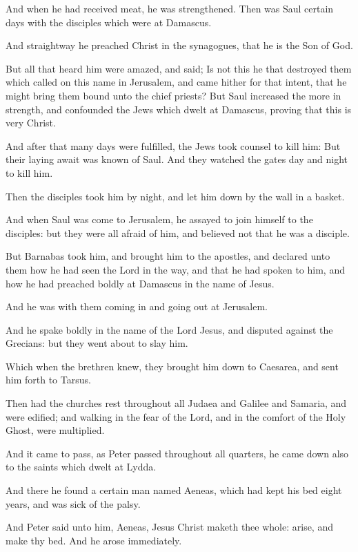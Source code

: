\verse And when he had received meat, he was strengthened. Then was Saul certain days with the disciples which were at Damascus.

\verse And straightway he preached Christ in the synagogues, that he is the Son of God.

\verse But all that heard him were amazed, and said; Is not this he that destroyed them which called on this name in Jerusalem, and came hither for that intent, that he might bring them bound unto the chief priests?  \verse But Saul increased the more in strength, and confounded the Jews which dwelt at Damascus, proving that this is very Christ.

\verse And after that many days were fulfilled, the Jews took counsel to kill him: \verse But their laying await was known of Saul. And they watched the gates day and night to kill him.

\verse Then the disciples took him by night, and let him down by the wall in a basket.

\verse And when Saul was come to Jerusalem, he assayed to join himself to the disciples: but they were all afraid of him, and believed not that he was a disciple.

\verse But Barnabas took him, and brought him to the apostles, and declared unto them how he had seen the Lord in the way, and that he had spoken to him, and how he had preached boldly at Damascus in the name of Jesus.

\verse And he was with them coming in and going out at Jerusalem.

\verse And he spake boldly in the name of the Lord Jesus, and disputed against the Grecians: but they went about to slay him.

\verse Which when the brethren knew, they brought him down to Caesarea, and sent him forth to Tarsus.

\verse Then had the churches rest throughout all Judaea and Galilee and Samaria, and were edified; and walking in the fear of the Lord, and in the comfort of the Holy Ghost, were multiplied.

\verse And it came to pass, as Peter passed throughout all quarters, he came down also to the saints which dwelt at Lydda.

\verse And there he found a certain man named Aeneas, which had kept his bed eight years, and was sick of the palsy.

\verse And Peter said unto him, Aeneas, Jesus Christ maketh thee whole: arise, and make thy bed. And he arose immediately.

